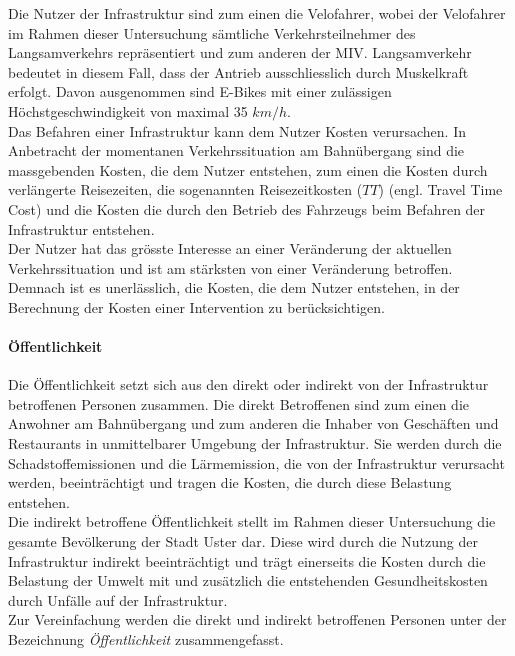 Die Nutzer der Infrastruktur sind zum einen die Velofahrer, wobei der Velofahrer im Rahmen dieser Untersuchung sämtliche Verkehrsteilnehmer des Langsamverkehrs repräsentiert und zum anderen der MIV. Langsamverkehr bedeutet in diesem Fall, dass der Antrieb ausschliesslich durch Muskelkraft erfolgt. Davon ausgenommen sind E-Bikes mit einer zulässigen Höchstgeschwindigkeit von maximal 35 $km/h$. \\
Das Befahren einer Infrastruktur kann dem Nutzer Kosten verursachen. In Anbetracht der momentanen Verkehrssituation am Bahnübergang sind die massgebenden Kosten, die dem Nutzer entstehen, zum einen die Kosten durch verlängerte Reisezeiten, die sogenannten Reisezeitkosten ($TT$) (engl. Travel Time Cost) und die Kosten die durch den Betrieb des Fahrzeugs beim Befahren der Infrastruktur entstehen.  \\
Der Nutzer hat das grösste Interesse an einer Veränderung der aktuellen Verkehrssituation und ist am stärksten von einer Veränderung betroffen. Demnach ist es unerlässlich, die Kosten, die dem Nutzer entstehen, in der Berechnung der Kosten einer Intervention zu berücksichtigen.


\paragraph{Öffentlichkeit}

Die Öffentlichkeit setzt sich aus den direkt oder indirekt von der Infrastruktur betroffenen Personen zusammen. 
Die direkt Betroffenen sind zum einen die Anwohner am Bahnübergang und zum anderen die Inhaber von Geschäften und Restaurants in unmittelbarer Umgebung der Infrastruktur. Sie werden durch die Schadstoffemissionen und die Lärmemission, die von der Infrastruktur verursacht werden, beeinträchtigt und tragen die Kosten, die durch diese Belastung entstehen. \\
Die indirekt betroffene Öffentlichkeit stellt im Rahmen dieser Untersuchung die gesamte Bevölkerung der Stadt Uster dar. Diese wird durch die Nutzung der Infrastruktur indirekt beeinträchtigt und trägt einerseits die Kosten durch die Belastung der Umwelt mit und zusätzlich die entstehenden Gesundheitskosten durch Unfälle auf der Infrastruktur. \\
Zur Vereinfachung werden die direkt und indirekt betroffenen Personen unter der Bezeichnung \textit{Öffentlichkeit} zusammengefasst.
 


%


